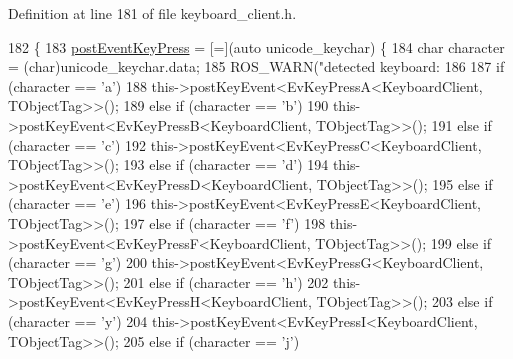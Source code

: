 Definition at line 181 of file keyboard\+\_\+client.\+h.


\begin{DoxyCode}
182         \{
183                 \hyperlink{classsm__three__some_1_1KeyboardClient_a6f2eb3f03eb4083abe101823910fcda4}{postEventKeyPress} = [=](\textcolor{keyword}{auto} unicode\_keychar) \{
184                         \textcolor{keywordtype}{char} character = (char)unicode\_keychar.data;
185                         ROS\_WARN(\textcolor{stringliteral}{"detected keyboard: %
186 
187                         \textcolor{keywordflow}{if} (character == \textcolor{charliteral}{'a'})
188                                 this->postKeyEvent<EvKeyPressA<KeyboardClient, TObjectTag>>();
189                         \textcolor{keywordflow}{else} \textcolor{keywordflow}{if} (character == \textcolor{charliteral}{'b'})
190                                 this->postKeyEvent<EvKeyPressB<KeyboardClient, TObjectTag>>();
191                         \textcolor{keywordflow}{else} \textcolor{keywordflow}{if} (character == \textcolor{charliteral}{'c'})
192                                 this->postKeyEvent<EvKeyPressC<KeyboardClient, TObjectTag>>();
193                         \textcolor{keywordflow}{else} \textcolor{keywordflow}{if} (character == \textcolor{charliteral}{'d'})
194                                 this->postKeyEvent<EvKeyPressD<KeyboardClient, TObjectTag>>();
195                         \textcolor{keywordflow}{else} \textcolor{keywordflow}{if} (character == \textcolor{charliteral}{'e'})
196                                 this->postKeyEvent<EvKeyPressE<KeyboardClient, TObjectTag>>();
197                         \textcolor{keywordflow}{else} \textcolor{keywordflow}{if} (character == \textcolor{charliteral}{'f'})
198                                 this->postKeyEvent<EvKeyPressF<KeyboardClient, TObjectTag>>();
199                         \textcolor{keywordflow}{else} \textcolor{keywordflow}{if} (character == \textcolor{charliteral}{'g'})
200                                 this->postKeyEvent<EvKeyPressG<KeyboardClient, TObjectTag>>();
201                         \textcolor{keywordflow}{else} \textcolor{keywordflow}{if} (character == \textcolor{charliteral}{'h'})
202                                 this->postKeyEvent<EvKeyPressH<KeyboardClient, TObjectTag>>();
203                         \textcolor{keywordflow}{else} \textcolor{keywordflow}{if} (character == \textcolor{charliteral}{'y'})
204                                 this->postKeyEvent<EvKeyPressI<KeyboardClient, TObjectTag>>();
205                         \textcolor{keywordflow}{else} \textcolor{keywordflow}{if} (character == \textcolor{charliteral}{'j'})
}
\end{DoxyCode}
